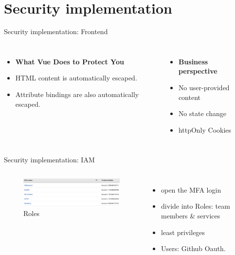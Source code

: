 \documentclass[aspectratio=169]{beamer}
\begin{document}
\section{Security implementation}

\begin{frame}[fragile]{Security implementation: Frontend}

  \begin{columns}
	  \begin{itemize}
		  \item \textbf{What Vue Does to Protect You}
        \pause
        \item HTML content is automatically escaped.
        \item Attribute bindings are also automatically escaped.
      \end{itemize}

      \begin{itemize}
		  \item \textbf{Business perspective}
		\pause
        \item No user-provided content
        \pause
        \item No state change
		\pause
		\item httpOnly Cookies
      \end{itemize}
  \end{columns}

\end{frame}

\begin{frame}[fragile]{Security implementation: IAM}

  \begin{columns}
      \begin{figure}[htbp]
        \centerline{\includegraphics[width=220pt]{images/roles.png}}
        \caption{Roles}
        \label{roles}
      \end{figure}
      \begin{itemize}
        \item open the MFA login
        \item divide into Roles: team members \& services
        \item least privileges
        \pause
        \item Users: Github Oauth. \cite{Authoriz26:online}
      \end{itemize}
  \end{columns}

\end{frame}
\end{document}
